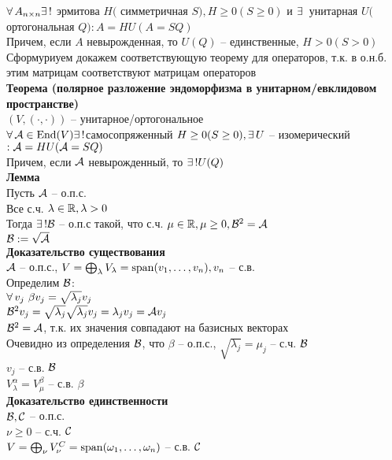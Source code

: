 \documentclass[12pt]{article}
\begin{document}
$\forall\, A_{n\times n} \exists\,!$ эрмитова $H($ симметричная $S), H \geq 0(S \geq 0)$ и $\exists\,$ унитарная $U($ ортогональная $Q): A=HU (A=SQ)$\\
Причем, если $A$ невырожденная, то $U(Q)$ -- единственные, $H>0(S>0)$\\
Сформуриуем докажем соответствующую теорему для операторов, т.к. в о.н.б. этим матрицам соответствуют матрицам операторов\\
\textbf{Теорема (полярное разложение эндоморфизма в унитарном/евклидовом пространстве)}\\
$(V, (\cdot, \cdot))$ -- унитарное/ортогональное\\
$\forall\, \mathcal{A} \in \operatorname{End}(V) \exists\,! $самосопряженный $H \geq 0(S\geq 0), \exists\, U$ -- изомерический $: \mathcal{A} = HU (\mathcal{A} = SQ)$\\
Причем, если $\mathcal{A}$ невырожденный, то $\exists\,! U(Q)$\\%
\textbf{Лемма}\\
Пусть $\mathcal{A}$ -- о.п.с.\\
Все с.ч. $\lambda \in \mathbb{R}, \lambda > 0$\\
Тогда $\exists\,! \mathcal{B}$ -- о.п.с такой, что с.ч. $\mu \in \mathbb{R}, \mu \geq 0, \mathcal{B}^2 = \mathcal{A}$\\
$\mathcal{B} := \sqrt{\mathcal{A}}$\\
\textbf{Доказательство существования}\\
$\mathcal{A}$ -- о.п.с., $V = \bigoplus_{\lambda} V_\lambda = \operatorname{span}(v_1, \ldots, v_n), v_n$ -- с.в.\\
Определим $\mathcal{B}$:\\
$\forall\, v_j\ \beta v_j = \sqrt{\lambda_j} v_j$\\
$\mathcal{B}^2 v_j = \sqrt{\lambda_j} \sqrt{\lambda_j} v_j = \lambda_j v_j = \mathcal{A} v_j$\\
$\mathcal{B}^2 = \mathcal{A}$, т.к. их значения совпадают на базисных векторах\\
Очевидно из определения $\mathcal{B}$, что $\beta$ -- о.п.с., $\sqrt{\lambda_j} = \mu_j$ -- с.ч. $\mathcal{B}$\\
$v_j$ -- с.в. $\mathcal{B}$\\
$V_\lambda^\alpha = V_\mu^\beta$ -- с.в. $\beta$\\
\textbf{Доказательство единственности}\\
$\mathcal{B}, \mathcal{C}$ -- о.п.с.\\
$\nu \geq 0$ -- с.ч. $\mathcal{C}$\\
$V = \bigoplus_{\nu}V_\nu^C = \operatorname{span}(\omega_1, \ldots, \omega_n)$ -- с.в. $\mathcal{C}$\\
\end{document}
